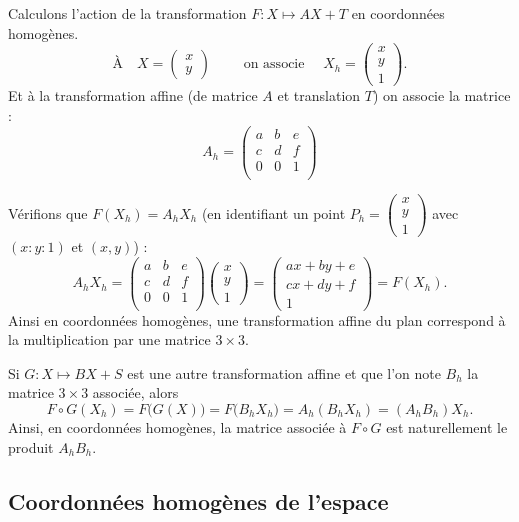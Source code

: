 \documentclass[11pt,class=report,crop=false]{standalone}
\begin{document}
Calculons l'action de la transformation $F :  X \mapsto AX+T$ en coordonnées homogènes.
$$\text{À} \quad X = \begin{pmatrix} x \\ y \end{pmatrix}
\qquad \text{ on associe }\quad X_h = \begin{pmatrix} x \\ y \\ 1 \end{pmatrix}.$$
Et à la transformation affine (de matrice $A$ et translation $T$) on associe la matrice :
$$A_h 
=  \begin{pmatrix}
a & b & e \\
c & d & f \\
0 & 0 & 1 \\
\end{pmatrix}$$

Vérifions que $F(X_h) = A_h X_h$ (en identifiant un point $P_h =  \left(\begin{smallmatrix}x\\y\\1\end{smallmatrix}\right)$ avec $(x:y:1)$ et $(x,y)$) :
$$A_h X_h = \begin{pmatrix}
a & b & e \\
c & d & f \\
0 & 0 & 1 \\
\end{pmatrix}
\begin{pmatrix} x \\ y \\ 1 \end{pmatrix}
= \begin{pmatrix} ax + by + e \\ cx + dy + f \\ 1 \end{pmatrix}
= F(X_h).$$
Ainsi en coordonnées homogènes, une transformation affine du plan correspond à la multiplication par une matrice $3\times 3$.

Si $G : X \mapsto BX+S$ est une autre transformation affine et que l'on note $B_h$ la matrice $3 \times 3$ associée, alors 
$$F \circ G (X_h) 
= F\big( G(X) \big) 
= F\big( B_hX_h \big) 
= A_h (B_hX_h)
= (A_hB_h)X_h.$$
Ainsi, en coordonnées homogènes, la matrice associée à $F\circ G$ est naturellement le produit $A_h B_h$.


\subsection{Coordonnées homogènes de l'espace}
\end{document}
